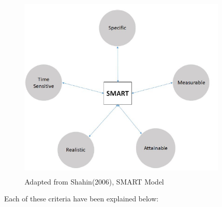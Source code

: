 \begin{figure}[H]
    \centering
    \captionsetup{justification=centering, margin=2cm}
    \vspace{1cm}
    \includegraphics[width=10cm, height=9cm]{figure/auxiliary/fig42.PNG}
    \caption{Adapted from Shahin(2006), SMART Model}
    \label{fig:4.2}
\end{figure}

Each of these criteria have been explained below:

